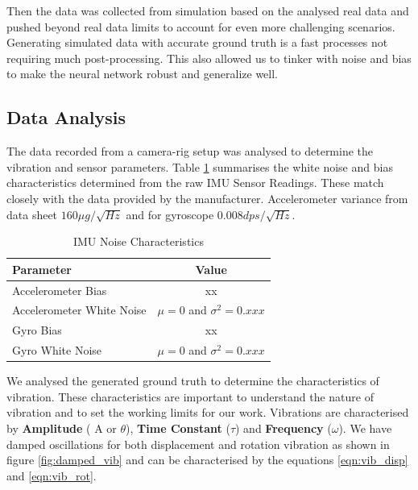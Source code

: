 Then the data was collected from simulation based on the analysed real data and pushed beyond real data limits to account for even more challenging scenarios. Generating simulated data with accurate ground truth is a fast processes not requiring much post-processing. This also allowed us to tinker with noise and bias to make the neural network robust and generalize well.

\subsection{Data Analysis}
\label{data_analysis}
The data recorded from a camera-rig setup was analysed to determine the vibration and sensor parameters. Table \ref{tab:imu_noise_characteristics} summarises the white noise and bias characteristics determined from the raw IMU Sensor Readings. These match closely with the data provided by the manufacturer. Accelerometer variance from data sheet $ 160 \mu g /\sqrt{Hz} $ and for gyroscope $ 0.008 dps /\sqrt{Hz}  $.

\begin{table}[ht]
\centering
\begin{tabular}{l|c}
    Parameter & Value \\ \hline
    Accelerometer Bias & xx \\  
    Accelerometer White Noise & $ \mu = 0 $ and $ \sigma^{2}=0.xxx $ \\  
    Gyro Bias & xx \\  
    Gyro White Noise & $ \mu = 0 $ and $ \sigma^{2}=0.xxx $ \\  
\end{tabular}
\caption{IMU Noise Characteristics}
\label{tab:imu_noise_characteristics}
\end{table}

We analysed the generated ground truth to determine the characteristics of vibration. These characteristics are important to understand the nature of vibration and to set the working limits for our work. Vibrations are characterised by \textbf{Amplitude} ( A or  $ \theta $), \textbf{Time Constant} ($ \tau $) and \textbf{Frequency} ($ \omega $). We have damped oscillations for both displacement and rotation vibration as shown in figure \ref{fig:damped_vib} and can be characterised by the equations \ref{eqn:vib_disp} and \ref{eqn:vib_rot}.

